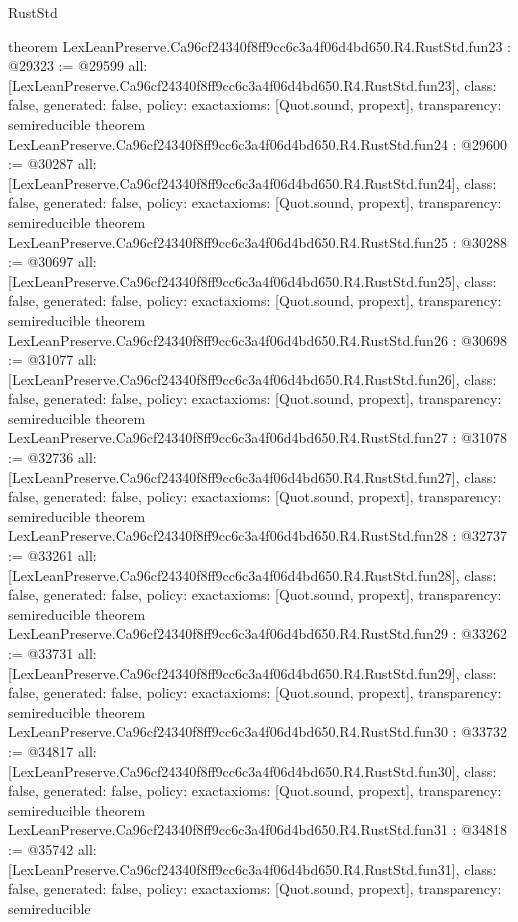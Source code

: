 \begin{lexlean}{RustStd}
\begin{coremodule}
{}
theorem LexLeanPreserve.Ca96cf24340f8ff9cc6c3a4f06d4bd650.R4.RustStd.fun23 : @29323 := @29599 {
  all: [LexLeanPreserve.Ca96cf24340f8ff9cc6c3a4f06d4bd650.R4.RustStd.fun23],
  class: false,
  generated: false,
  policy: exact{axioms: [Quot.sound, propext]},
  transparency: semireducible
}
theorem LexLeanPreserve.Ca96cf24340f8ff9cc6c3a4f06d4bd650.R4.RustStd.fun24 : @29600 := @30287 {
  all: [LexLeanPreserve.Ca96cf24340f8ff9cc6c3a4f06d4bd650.R4.RustStd.fun24],
  class: false,
  generated: false,
  policy: exact{axioms: [Quot.sound, propext]},
  transparency: semireducible
}
theorem LexLeanPreserve.Ca96cf24340f8ff9cc6c3a4f06d4bd650.R4.RustStd.fun25 : @30288 := @30697 {
  all: [LexLeanPreserve.Ca96cf24340f8ff9cc6c3a4f06d4bd650.R4.RustStd.fun25],
  class: false,
  generated: false,
  policy: exact{axioms: [Quot.sound, propext]},
  transparency: semireducible
}
theorem LexLeanPreserve.Ca96cf24340f8ff9cc6c3a4f06d4bd650.R4.RustStd.fun26 : @30698 := @31077 {
  all: [LexLeanPreserve.Ca96cf24340f8ff9cc6c3a4f06d4bd650.R4.RustStd.fun26],
  class: false,
  generated: false,
  policy: exact{axioms: [Quot.sound, propext]},
  transparency: semireducible
}
theorem LexLeanPreserve.Ca96cf24340f8ff9cc6c3a4f06d4bd650.R4.RustStd.fun27 : @31078 := @32736 {
  all: [LexLeanPreserve.Ca96cf24340f8ff9cc6c3a4f06d4bd650.R4.RustStd.fun27],
  class: false,
  generated: false,
  policy: exact{axioms: [Quot.sound, propext]},
  transparency: semireducible
}
theorem LexLeanPreserve.Ca96cf24340f8ff9cc6c3a4f06d4bd650.R4.RustStd.fun28 : @32737 := @33261 {
  all: [LexLeanPreserve.Ca96cf24340f8ff9cc6c3a4f06d4bd650.R4.RustStd.fun28],
  class: false,
  generated: false,
  policy: exact{axioms: [Quot.sound, propext]},
  transparency: semireducible
}
theorem LexLeanPreserve.Ca96cf24340f8ff9cc6c3a4f06d4bd650.R4.RustStd.fun29 : @33262 := @33731 {
  all: [LexLeanPreserve.Ca96cf24340f8ff9cc6c3a4f06d4bd650.R4.RustStd.fun29],
  class: false,
  generated: false,
  policy: exact{axioms: [Quot.sound, propext]},
  transparency: semireducible
}
theorem LexLeanPreserve.Ca96cf24340f8ff9cc6c3a4f06d4bd650.R4.RustStd.fun30 : @33732 := @34817 {
  all: [LexLeanPreserve.Ca96cf24340f8ff9cc6c3a4f06d4bd650.R4.RustStd.fun30],
  class: false,
  generated: false,
  policy: exact{axioms: [Quot.sound, propext]},
  transparency: semireducible
}
theorem LexLeanPreserve.Ca96cf24340f8ff9cc6c3a4f06d4bd650.R4.RustStd.fun31 : @34818 := @35742 {
  all: [LexLeanPreserve.Ca96cf24340f8ff9cc6c3a4f06d4bd650.R4.RustStd.fun31],
  class: false,
  generated: false,
  policy: exact{axioms: [Quot.sound, propext]},
  transparency: semireducible
}
\end{coremodule}
\end{lexlean}
